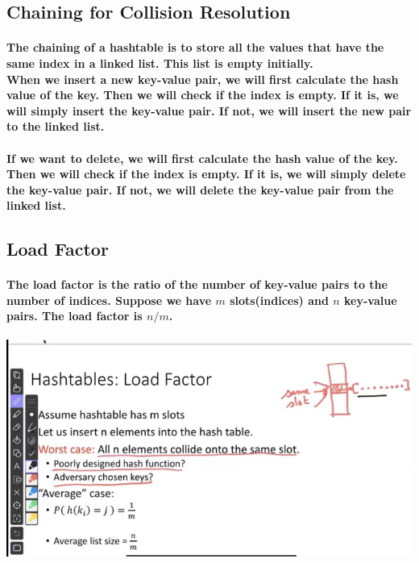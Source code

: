 \documentclass{article}
\begin{document}
\subsection{Chaining for Collision Resolution}

\paragraph{The chaining of a hashtable is to store all the values that have the same index in a linked list. This list is empty initially.\\
When we insert a new key-value pair, we will first calculate the hash value of the key. Then we will check if the index is empty. 
If it is, we will simply insert the key-value pair. If not, we will insert the new pair to the linked list.\\}

\paragraph{If we want to delete, we will first calculate the hash value of the key. Then we will check if the index is empty. If it is, we will simply delete the key-value pair. 
If not, we will delete the key-value pair from the linked list.\\}

\subsection{Load Factor}

\paragraph{The load factor is the ratio of the number of key-value pairs to the number of indices. Suppose we have $m$ slots(indices) and $n$ key-value pairs.
The load factor is $n/m$.\\}


\includegraphics[width=\textwidth]{hashtableloadfactor.png}
\end{document}
